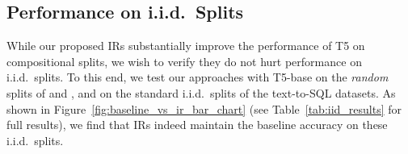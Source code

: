 \subsection{Performance on i.i.d.\ Splits}

While our proposed IRs substantially improve the performance of T5 on compositional splits, we wish to verify they do not hurt performance on i.i.d.\ splits. To this end, we test our approaches with T5-base on the \emph{random} splits of \scan{} and \cfq{}, and on the standard i.i.d.\ splits of the text-to-SQL datasets.
As shown in Figure~\ref{fig:baseline_vs_ir_bar_chart} (see Table~\ref{tab:iid_results} for full results), we find that IRs indeed maintain the baseline accuracy on these i.i.d.\ splits.
%
